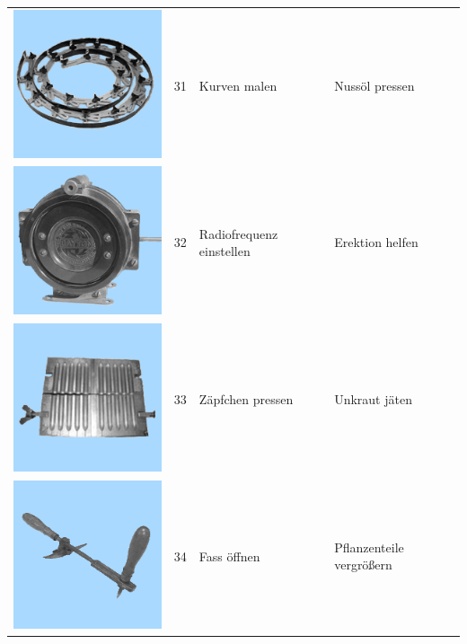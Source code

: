 \documentclass[
  english,
  man,floatsintext]{apa7}
\begin{document}
\begin{center}
\begin{ThreePartTable}
\begin{longtable}{llll}
\includegraphics[valign=c, scale=0.19]{../materials/unfamiliar/31.png} & 31 & Kurven malen & Nussöl pressen\\
\includegraphics[valign=c, scale=0.19]{../materials/unfamiliar/32.png} & 32 & Radiofrequenz einstellen & Erektion helfen\\
\includegraphics[valign=c, scale=0.19]{../materials/unfamiliar/33.png} & 33 & Zäpfchen pressen & Unkraut jäten\\
\includegraphics[valign=c, scale=0.19]{../materials/unfamiliar/34.png} & 34 & Fass öffnen & Pflanzenteile vergrößern\\

\end{longtable}
\end{ThreePartTable}
\end{center}
\end{document}
